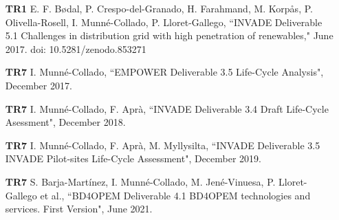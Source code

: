 \begin{itemize}
	\item[\textbf{TR1}] E. F. B\o{}dal, P. Crespo-del-Granado, H. Farahmand, M. Korp\aa{}s, P. Olivella-Rosell, I. Munn\'{e}-Collado, P. Lloret-Gallego, ``INVADE Deliverable 5.1 Challenges in distribution grid with high penetration of renewables," June 2017. doi: 10.5281/zenodo.853271
	\item[\textbf{TR7}] I. Munn\'{e}-Collado, ``EMPOWER Deliverable 3.5 Life-Cycle Analysis", December 2017.
	\item[\textbf{TR7}] I. Munn\'{e}-Collado, F. Apr\`{a}, ``INVADE Deliverable 3.4 Draft Life-Cycle Asessment", December 2018.
	\item[\textbf{TR7}] I. Munn\'{e}-Collado, F. Apr\`{a}, M. Myllysilta, ``INVADE Deliverable 3.5 INVADE Pilot-sites Life-Cycle Assessment", December 2019.	
	\item[\textbf{TR7}] S. Barja-Mart\'{i}nez, I. Munn\'{e}-Collado, M. Jen\'{e}-Vinuesa, P. Lloret-Gallego et al., ``BD4OPEM Deliverable 4.1 BD4OPEM technologies and services. First Version", June 2021.	
\end{itemize}
